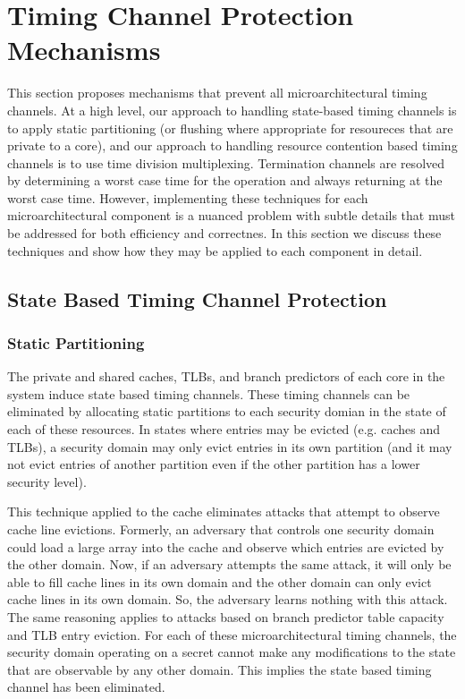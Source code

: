 \section{Timing Channel Protection Mechanisms}
This section proposes mechanisms that prevent all microarchitectural timing 
channels. At a high level, our approach to handling state-based timing channels 
is to apply static partitioning (or flushing where appropriate for resoureces 
that are private to a core), and our approach to handling resource contention 
based timing channels is to use time division multiplexing.  Termination 
channels are resolved by determining a worst case time for the operation and 
always returning at the worst case time. However, implementing these techniques 
for each microarchitectural component is a nuanced problem with subtle details 
that must be addressed for both efficiency and correctnes. In this section we 
discuss these techniques and show how they may be applied to each component in 
detail.

\subsection{State Based Timing Channel Protection}
\subsubsection{Static Partitioning}
The private and shared caches, TLBs, and branch predictors of each core in the 
system induce state based timing channels.  These timing channels can be 
eliminated by allocating static partitions to each security domian in the state 
of each of these resources. In states where entries may be evicted (e.g. caches 
and TLBs), a security domain may only evict entries in its own partition (and 
it may not evict entries of another partition even if the other partition has a 
lower security level).

This technique applied to the cache eliminates attacks that attempt to observe 
cache line evictions. Formerly, an adversary that controls one security domain 
could load a large array into the cache and observe which entries are evicted 
by the other domain. Now, if an adversary attempts the same attack, it will 
only be able to fill cache lines in its own domain and the other domain can 
only evict cache lines in its own domain. So, the adversary learns nothing with 
this attack. The same reasoning applies to attacks based on branch predictor 
table capacity and TLB entry eviction. For each of these microarchitectural 
timing channels, the security domain operating on a secret cannot make any 
modifications to the state that are observable by any other domain. This 
implies the state based timing channel has been eliminated.

